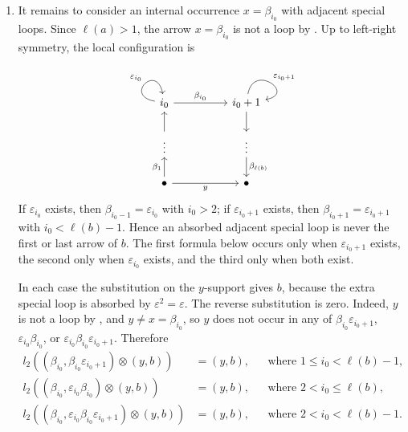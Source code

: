 \documentclass[11pt,a4paper,reqno]{amsart}
\newcommand{\para}[2]{(#1,#2)}
\newcommand{\ep}{\varepsilon}
\newcommand{\bi}{\beta_{i_0}}
\newcommand{\epi}{\varepsilon_{i_0}}
\newcommand{\bet}{\beta_{\ell(b)}}
\theoremstyle{plain}
\theoremstyle{definition}
\numberwithin{equation}{section}
\begin{document}
\begin{enumerate}
\begin{enumerate}
			\item It remains to consider an internal occurrence $x=\bi$ with
			adjacent special loops.  Since $\ell(a)>1$, the arrow $x=\bi$ is not
			a loop by .  Up to left-right symmetry, the local
			configuration is
			\[
			\begin{tikzcd}
				i_0 && i_0+1 \\
				\vdots && \vdots \\
				\bullet && \bullet
				\arrow["{\ep_{i_0}}", from=1-1, to=1-1, loop, in=100, out=170, distance=10mm]
				\arrow["\bi", from=1-1, to=1-3]
				\arrow["{\ep_{i_0+1}}", from=1-3, to=1-3, loop, in=10, out=80, distance=10mm]
				\arrow[from=1-3, to=2-3]
				\arrow[from=2-1, to=1-1]
				\arrow["\bet", from=2-3, to=3-3]
				\arrow["{\beta_1}", from=3-1, to=2-1]
				\arrow["y"', from=3-1, to=3-3]
			\end{tikzcd}
			\]
			If $\epi$ exists, then $\beta_{i_0-1}=\epi$ with $i_0>2$; if
			$\ep_{i_0+1}$ exists, then
			$\beta_{i_0+1}=\ep_{i_0+1}$ with $i_0<\ell(b)-1$.  Hence an
			absorbed adjacent special loop is never the first or last arrow of
			$b$.  The first formula below occurs only when $\ep_{i_0+1}$ exists,
			the second only when $\epi$ exists, and the third only when both exist.
			
			In each case the substitution on the $y$-support gives $b$, because
			the extra special loop is absorbed by $\varepsilon^2=\varepsilon$.
			The reverse substitution is zero.  Indeed, $y$ is not a loop by
			, and $y\neq x=\bi$, so $y$ does not occur in any of
			$\bi\ep_{i_0+1}$, $\epi\bi$, or $\epi\bi\ep_{i_0+1}$.
			Therefore
			\begin{equation}\label{eq:xneqy-idempotent-absorption}
				\begin{aligned}
					l_2(\para{\bi}{\bi\ep_{i_0+1}}\otimes\para{y}{b})
					&=\para{y}{b},
					&&\text{where }1\leq i_0<\ell(b)-1,\\
					l_2(\para{\bi}{\epi\bi}\otimes\para{y}{b})
					&=\para{y}{b},
					&&\text{where }2<i_0\leq\ell(b),\\
					l_2(\para{\bi}{\epi\bi\ep_{i_0+1}}\otimes\para{y}{b})
					&=\para{y}{b},
					&&\text{where }2<i_0<\ell(b)-1.
				\end{aligned}
			\end{equation}
		\end{enumerate}
	\end{enumerate}
	
\end{document}
